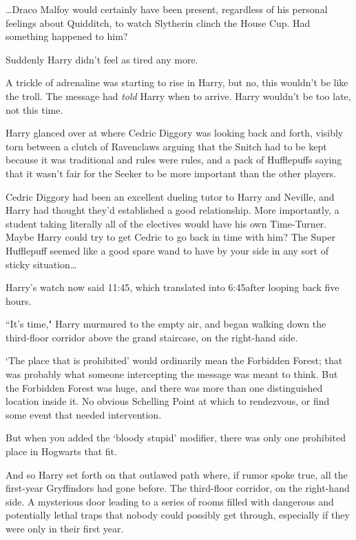 {\ldots}Draco Malfoy would certainly have been present, regardless of his personal feelings about Quidditch, to watch Slytherin clinch the House Cup. Had something happened to him?

Suddenly Harry didn't feel as tired any more.

A trickle of adrenaline was starting to rise in Harry, but no, this wouldn't be like the troll. The message had \emph{told} Harry when to arrive. Harry wouldn't be too late, not this time.

Harry glanced over at where Cedric Diggory was looking back and forth, visibly torn between a clutch of Ravenclaws arguing that the Snitch had to be kept because it was traditional and rules were rules, and a pack of Hufflepuffs saying that it wasn't fair for the Seeker to be more important than the other players.

Cedric Diggory had been an excellent dueling tutor to Harry and Neville, and Harry had thought they'd established a good relationship. More importantly, a student taking literally all of the electives would have his own Time-Turner. Maybe Harry could try to get Cedric to go back in time with him? The Super Hufflepuff seemed like a good spare wand to have by your side in any sort of sticky situation{\ldots}


Harry's watch now said 11:45, which translated into 6:45\pm after looping back five hours.

``It's time," Harry murmured to the empty air, and began walking down the third-floor corridor above the grand staircase, on the right-hand side.

`The place that is prohibited' would ordinarily mean the Forbidden Forest; that was probably what someone intercepting the message was meant to think. But the Forbidden Forest was huge, and there was more than one distinguished location inside it. No obvious Schelling Point at which to rendezvous, or find some event that needed intervention.

But when you added the `bloody stupid' modifier, there was only one prohibited place in Hogwarts that fit.

And so Harry set forth on that outlawed path where, if rumor spoke true, all the first-year Gryffindors had gone before. The third-floor corridor, on the right-hand side. A mysterious door leading to a series of rooms filled with dangerous and potentially lethal traps that nobody could possibly get through, especially if they were only in their first year.

